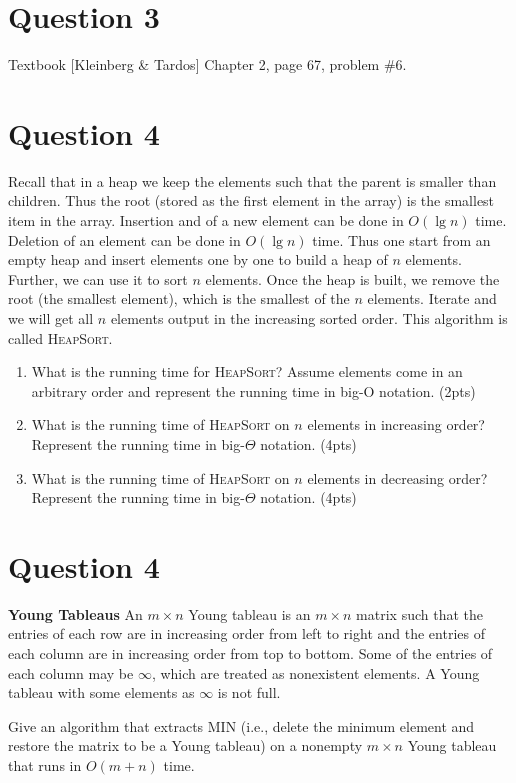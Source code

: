 \documentclass[11pt]{article}
\begin{document}
\section{Question 3} Textbook [Kleinberg \& Tardos] Chapter 2, page 67, problem \#6.

\section{Question 4} Recall that in a heap we keep the elements such that the parent is smaller than children. Thus the root (stored as the first element in the array) is the smallest item in the array. Insertion and of a new element can be done in $O(\lg n)$ time. Deletion of an element can be done in $O(\lg n)$ time. Thus one start from an empty heap and insert elements one by one to build a heap of $n$ elements. Further, we can use it to sort $n$ elements. Once the heap is built, we remove the root (the smallest element), which is the smallest of the $n$ elements. Iterate and we will get all $n$ elements output in the increasing sorted order.  This algorithm is called  \textsc{HeapSort}.
 
\begin{enumerate}
\item What is the running time for \textsc{HeapSort}? Assume elements come in an arbitrary order and represent the running time in big-O notation. (2pts)
\item What is the running time of \textsc{HeapSort} on $n$ elements in increasing order? Represent the running time in big-$\Theta$ notation. (4pts)
\item What is the running time of \textsc{HeapSort} on $n$ elements in decreasing order?  Represent the running time in big-$\Theta$ notation. (4pts)
\end{enumerate}

\section{Question 4} \textbf{Young Tableaus} An $m \times n$ Young tableau is an $m\times n$ matrix such that the entries of each row are in increasing order from left to right and the entries of each column are in increasing order from top to bottom. Some of the entries of each column may be $\infty$, which are treated as nonexistent elements. A Young tableau with some elements as $\infty$ is not full. 

Give an algorithm that extracts MIN (i.e., delete the minimum element and restore the matrix to be a Young tableau) on a nonempty $m\times n$ Young tableau that runs in $O(m+n)$ time. 
\end{document}
